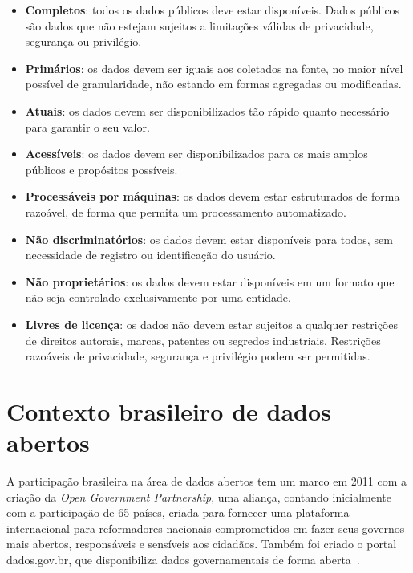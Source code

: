 \begin{itemize}
\item \textbf{Completos}: todos os dados públicos deve estar disponíveis. Dados públicos são dados que não estejam sujeitos a limitações válidas de privacidade, segurança ou privilégio.

\item \textbf{Primários}: os dados devem ser iguais aos coletados na fonte, no maior nível possível de granularidade, não estando em formas agregadas ou modificadas.

\item \textbf{Atuais}: os dados devem ser disponibilizados tão rápido quanto necessário para garantir o seu valor.

\item \textbf{Acessíveis}: os dados devem ser disponibilizados para os mais amplos públicos e propósitos possíveis.

\item \textbf{Processáveis por máquinas}: os dados devem estar estruturados de forma razoável, de forma que permita um processamento automatizado.

\item \textbf{Não discriminatórios}: os dados devem estar disponíveis para todos, sem necessidade de registro ou identificação do usuário.

\item \textbf{Não proprietários}: os dados devem estar disponíveis em um formato que não seja controlado exclusivamente por uma entidade.

\item \textbf{Livres de licença}: os dados não devem estar sujeitos a qualquer restrições de direitos autorais, marcas, patentes ou segredos industriais. Restrições razoáveis de privacidade, segurança e privilégio podem ser permitidas.

\end{itemize}

\section{Contexto brasileiro de dados abertos}
A participação brasileira na área de dados abertos tem um marco em 2011 com a criação da \emph{Open Government Partnership}, uma aliança, contando inicialmente com a participação de 65 países, criada para fornecer uma plataforma internacional para reformadores nacionais comprometidos em fazer seus governos mais abertos, responsáveis e sensíveis aos cidadãos. Também foi criado o portal dados.gov.br, que disponibiliza dados governamentais de forma aberta~\cite{seijiconectados}.


